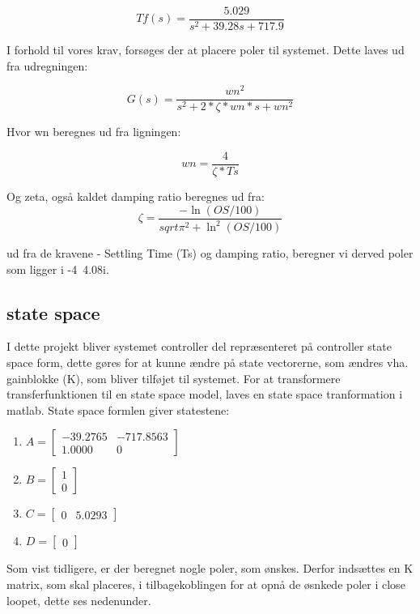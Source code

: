 \begin{equation}
  Tf(s) = \frac{5.029}{s^2 + 39.28 s + 717.9}
\end{equation}

I forhold til vores krav, forsøges der at placere poler til systemet. Dette laves ud fra udregningen: 


\begin{equation}
  G(s) = \frac{wn^2}{s^2+2*\zeta*wn*s+wn^2}
\end{equation}

Hvor wn beregnes ud fra ligningen:

\begin{equation}
  wn = \frac{4}{\zeta*Ts}
\end{equation} 

Og zeta, også kaldet damping ratio beregnes ud fra: 
\begin{equation}
  \zeta = \frac{-\ln(OS/100)}{sqrt{\pi^2+\ln^2(OS/100)}}
\end{equation} 

ud fra de kravene - Settling Time (Ts) og damping ratio, beregner vi derved poler som ligger i -4\textpm\ 4.08i. 

\subsection{state space}

I dette projekt bliver systemet controller del repræsenteret på controller state space form, dette gøres for at kunne ændre på state vectorerne, som ændres vha. gainblokke (K), som bliver tilføjet til systemet. For at transformere transferfunktionen til en state space model, laves en state space tranformation i matlab. State space formlen giver statestene: 

\begin{enumerate}
 
\item
 $
A = 
\begin{bmatrix}

	-39.2765 & -717.8563 \\
    1.0000     &    0
\end{bmatrix}
     $
\item
 $
B = 
\begin{bmatrix}

	1\\
    0
\end{bmatrix}
     $    
  
\item 
 $
C = 
\begin{bmatrix}

	0  &  5.0293
\end{bmatrix}
     $    
 \item
 $
D = 
\begin{bmatrix}

	0  
\end{bmatrix}
     $  
\end{enumerate}      
Som vist tidligere, er der beregnet nogle poler, som ønskes. Derfor indsættes en K matrix, som skal placeres, i tilbagekoblingen for at opnå de øsnkede poler i close loopet, dette ses nedenunder. 

